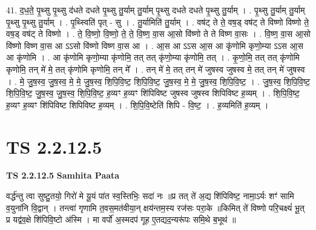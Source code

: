 \documentclass[17pt]{extarticle}
\begin{document}
41. द॒ध॒ते॒ पृ॒थ्सु पृ॒थ्सु द॑धते दधते पृ॒थ्सु तु॒र्याम् तु॒र्याम् पृ॒थ्सु दधते दधते पृ॒थ्सु तु॒र्याम् । . पृ॒थ्सु तु॒र्याम् तु॒र्याम् पृ॒थ्सु पृ॒थ्सु तु॒र्याम् । . पृ॒थ्स्विति॑ पृत् - सु । . तु॒र्यामिति॑ तु॒र्याम् । . वष॑ट् ते ते॒ वष॒ड् वष॑ट् ते विष्णो विष्णो ते॒ वष॒ड् वष॑ट् ते विष्णो । . ते॒ वि॒ष्णो॒ वि॒ष्णो॒ ते॒ ते॒ वि॒ष्ण॒ वा॒स आ॒सो वि॑ष्णो ते ते विष्ण वा॒सः । . वि॒ष्ण॒ वा॒स आ॒सो वि॑ष्णो विष्ण वा॒स आ ऽऽसो वि॑ष्णो विष्ण वा॒स आ । . आ॒स आ ऽऽस आ॒स आ कृ॑णोमि कृणो॒म्या ऽऽस आ॒स आ कृ॑णोमि । . आ कृ॑णोमि कृणो॒म्या कृ॑णोमि॒ तत् तत् कृ॑णो॒म्या कृ॑णोमि॒ तत् । . कृ॒णो॒मि॒ तत् तत् कृ॑णोमि कृणोमि॒ तन् मे॑ मे॒ तत् कृ॑णोमि कृणोमि॒ तन् मे᳚ । . तन् मे॑ मे॒ तत् तन् मे॑ जुषस्व जुषस्व मे॒ तत् तन् मे॑ जुषस्व । . मे॒ जु॒ष॒स्व॒ जु॒ष॒स्व॒ मे॒ मे॒ जु॒ष॒स्व॒ शि॒पि॒वि॒ष्ट॒ शि॒पि॒वि॒ष्ट॒ जु॒ष॒स्व॒ मे॒ मे॒ जु॒ष॒स्व॒ शि॒पि॒वि॒ष्ट॒ । . जु॒ष॒स्व॒ शि॒पि॒वि॒ष्ट॒ शि॒पि॒वि॒ष्ट॒ जु॒ष॒स्व॒ जु॒ष॒स्व॒ शि॒पि॒वि॒ष्ट॒ ह॒व्यꣳ ह॒व्यꣳ शि॑पिविष्ट जुषस्व जुषस्व शिपिविष्ट ह॒व्यम् । . शि॒पि॒वि॒ष्ट॒ ह॒व्यꣳ ह॒व्यꣳ शि॑पिविष्ट शिपिविष्ट ह॒व्यम् । . शि॒पि॒वि॒ष्टेति॑ शिपि - वि॒ष्ट॒ । . ह॒व्यमिति॑ ह॒व्यम् । \newline
\pagebreak
{}

\section{ TS 2.2.12.5 }

\textbf{TS 2.2.12.5 } \newline
\textbf{Samhita Paata} \newline

वर्द्ध॑न्तु त्वा सुष्टु॒तयो॒ गिरो॑ मे यू॒यं पा॑त स्व॒स्तिभिः॒ सदा॑ नः ॥प्र तत् ते॑ अ॒द्य शि॑पिविष्ट॒ नामा॒ऽर्यः शꣳ॑ सामि व॒युना॑नि वि॒द्वान् । तन्त्वा॑ गृणामि त॒वस॒मत॑वीया॒न् क्षय॑न्तम॒स्य रज॑सः परा॒के ॥किमित् ते॑ विष्णो परि॒चक्ष्यं॑ भू॒त् प्र यद्व॑व॒क्षे शि॑पिवि॒ष्टो अ॑स्मि । मा वर्पो॑ अ॒स्मदप॑ गूह ए॒तद्यद॒न्यरू॑पः समि॒थे ब॒भूथ॑ ॥ \newline
\end{document}
